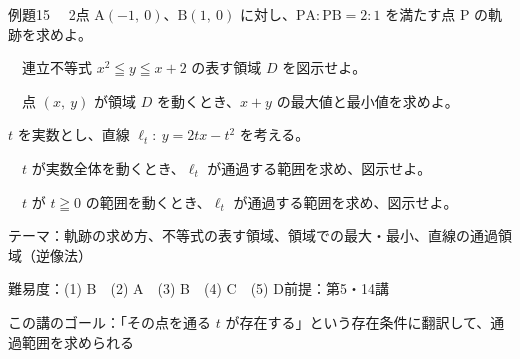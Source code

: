 \documentclass[paper=b5j, fontsize=8pt, fleqn, twoside]{jlreq}
\begin{document}
\begin{ascolorbox4A}[出典：オリジナル]{例題15}
  　2点 $\mathrm A(-1,\ 0)$、$\mathrm B(1,\ 0)$ に対し、$\mathrm{PA}:\mathrm{PB}=2:1$ を満たす点 P の軌跡を求めよ。\par
  　連立不等式 $x^2\leqq y\leqq x+2$ の表す領域 $D$ を図示せよ。\par
  　点 $(x,\ y)$ が領域 $D$ を動くとき、$x+y$ の最大値と最小値を求めよ。\par
  $t$ を実数とし、直線 $\ell_t:\ y=2tx-t^2$ を考える。\par
  　$t$ が実数全体を動くとき、$\ell_t$ が通過する範囲を求め、図示せよ。\par
  　$t$ が $t\geqq0$ の範囲を動くとき、$\ell_t$ が通過する範囲を求め、図示せよ。
\end{ascolorbox4A}

\begin{Data}
  テーマ：軌跡の求め方、不等式の表す領域、領域での最大・最小、直線の通過領域（逆像法）\par
  難易度：(1) B　(2) A　(3) B　(4) C　(5) D\quad 前提：第5・14講\par
  この講のゴール：「その点を通る $t$ が存在する」という存在条件に翻訳して、通過範囲を求められる
\end{Data}
\end{document}
